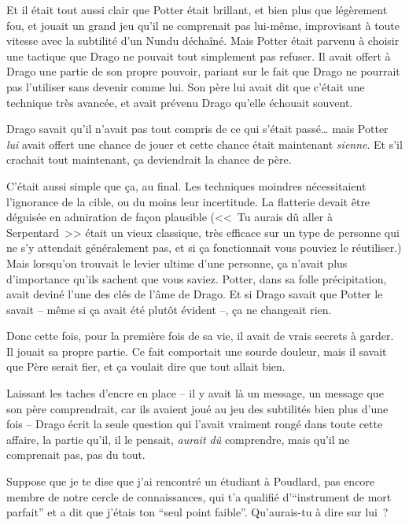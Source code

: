 Et il était tout aussi clair que Potter était brillant, et bien plus que légèrement fou, et jouait un grand jeu qu'il ne comprenait pas lui-même, improvisant à toute vitesse avec la subtilité d'un Nundu déchaîné. Mais Potter était parvenu à choisir une tactique que Drago ne pouvait tout simplement pas refuser. Il avait offert à Drago une partie de son propre pouvoir, pariant sur le fait que Drago ne pourrait pas l'utiliser sans devenir comme lui. Son père lui avait dit que c'était une technique très avancée, et avait prévenu Drago qu'elle échouait souvent.

Drago savait qu'il n'avait pas tout compris de ce qui s'était passé… mais Potter \emph{lui} avait offert une chance de jouer et cette chance était maintenant \emph{sienne}. Et s'il crachait tout maintenant, ça deviendrait la chance de père.

C'était aussi simple que ça, au final. Les techniques moindres nécessitaient l'ignorance de la cible, ou du moins leur incertitude. La flatterie devait être déguisée en admiration de façon plausible (<<~Tu aurais dû aller à Serpentard~>> était un vieux classique, très efficace sur un type de personne qui ne s'y attendait généralement pas, et si ça fonctionnait vous pouviez le réutiliser.) Mais lorsqu'on trouvait le levier ultime d'une personne, ça n'avait plus d'importance qu'ils sachent que vous saviez. Potter, dans sa folle précipitation, avait deviné l'une des clés de l'âme de Drago. Et si Drago savait que Potter le savait -- même si ça avait été plutôt évident --, ça ne changeait rien.

Donc cette fois, pour la première fois de sa vie, il avait de vrais secrets à garder. Il jouait sa propre partie. Ce fait comportait une sourde douleur, mais il savait que Père serait fier, et ça voulait dire que tout allait bien.

Laissant les taches d'encre en place -- il y avait là un message, un message que son père comprendrait, car ils avaient joué au jeu des subtilités bien plus d'une fois -- Drago écrit la seule question qui l'avait vraiment rongé dans toute cette affaire, la partie qu'il, il le pensait, \emph{aurait dû} comprendre, mais qu'il ne comprenait pas, pas du tout.

\begin{writtenNote}

Suppose que je te dise que j'ai rencontré un étudiant à Poudlard, pas encore membre de notre cercle de connaissances, qui t'a qualifié d’“instrument de mort parfait” et a dit que j'étais ton “seul point faible”. Qu'aurais-tu à dire sur lui~?

\end{writtenNote}

